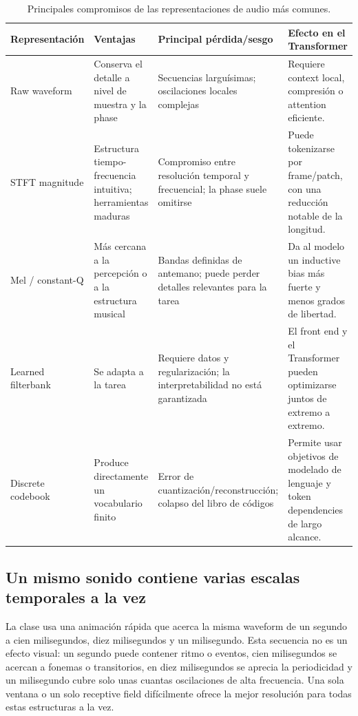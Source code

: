 \documentclass[a4paper]{article}
\begin{document}
\begin{table}[H]
\centering
\small
\caption{Principales compromisos de las representaciones de audio más comunes.}
\begin{tabularx}{\textwidth}{L{0.19\textwidth}L{0.22\textwidth}L{0.22\textwidth}X}
\toprule
Representación & Ventajas & Principal pérdida/sesgo & Efecto en el Transformer \\
\midrule
Raw waveform & Conserva el detalle a nivel de muestra y la phase & Secuencias larguísimas; oscilaciones locales complejas & Requiere context local, compresión o attention eficiente. \\
STFT magnitude & Estructura tiempo-frecuencia intuitiva; herramientas maduras & Compromiso entre resolución temporal y frecuencial; la phase suele omitirse & Puede tokenizarse por frame/patch, con una reducción notable de la longitud. \\
Mel / constant-Q & Más cercana a la percepción o a la estructura musical & Bandas definidas de antemano; puede perder detalles relevantes para la tarea & Da al modelo un inductive bias más fuerte y menos grados de libertad. \\
Learned filterbank & Se adapta a la tarea & Requiere datos y regularización; la interpretabilidad no está garantizada & El front end y el Transformer pueden optimizarse juntos de extremo a extremo. \\
Discrete codebook & Produce directamente un vocabulario finito & Error de cuantización/reconstrucción; colapso del libro de códigos & Permite usar objetivos de modelado de lenguaje y token dependencies de largo alcance. \\
\bottomrule
\end{tabularx}
\end{table}

\subsection{Un mismo sonido contiene varias escalas temporales a la vez}

La clase usa una animación rápida que acerca la misma waveform de un segundo a cien milisegundos, diez milisegundos y un milisegundo. Esta secuencia no es un efecto visual: un segundo puede contener ritmo o eventos, cien milisegundos se acercan a fonemas o transitorios, en diez milisegundos se aprecia la periodicidad y un milisegundo cubre solo unas cuantas oscilaciones de alta frecuencia. Una sola ventana o un solo receptive field difícilmente ofrece la mejor resolución para todas estas estructuras a la vez.
\end{document}
